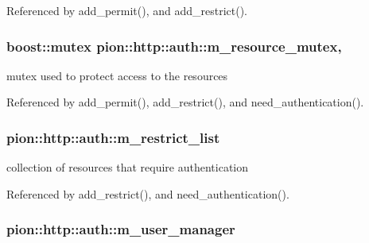 Referenced by add\-\_\-permit(), and add\-\_\-restrict().

\hypertarget{classpion_1_1http_1_1auth_a5c1e57d2531c833a747ebbf9f3efe213}{
\subsubsection[{m\-\_\-resource\-\_\-mutex}]{\setlength{\rightskip}{0pt plus 5cm}boost\-::mutex pion\-::http\-::auth\-::m\-\_\-resource\-\_\-mutex\hspace{0.3cm}{\ttfamily [mutable]}, {\ttfamily [protected]}}}\label{classpion_1_1http_1_1auth_a5c1e57d2531c833a747ebbf9f3efe213}


mutex used to protect access to the resources 



Referenced by add\-\_\-permit(), add\-\_\-restrict(), and need\-\_\-authentication().

\hypertarget{classpion_1_1http_1_1auth_a39970188567b9719e779dfe9ec0c901b}{
\subsubsection[{m\-\_\-restrict\-\_\-list}]{ pion\-::http\-::auth\-::m\-\_\-restrict\-\_\-list\hspace{0.3cm}{\ttfamily [protected]}}}\label{classpion_1_1http_1_1auth_a39970188567b9719e779dfe9ec0c901b}


collection of resources that require authentication 



Referenced by add\-\_\-restrict(), and need\-\_\-authentication().

\hypertarget{classpion_1_1http_1_1auth_a5f85a718dc74306a6f62c931d2b4bc53}{
\subsubsection[{m\-\_\-user\-\_\-manager}]{ pion\-::http\-::auth\-::m\-\_\-user\-\_\-manager\hspace{0.3cm}{\ttfamily [protected]}}}\label{classpion_1_1http_1_1auth_a5f85a718dc74306a6f62c931d2b4bc53}


